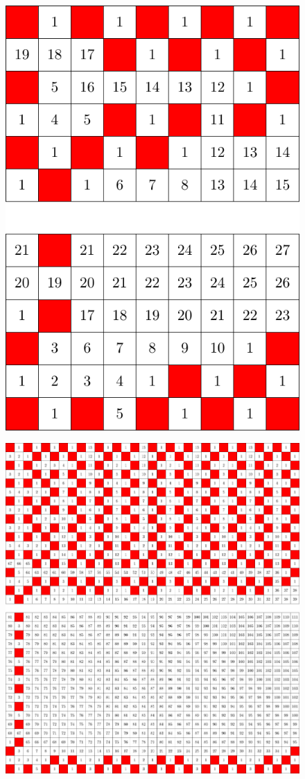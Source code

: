 \begin{figure}[]
\centering
\includegraphics[width=\textwidth]{figures/4/6x9x2_numbered_heatmap.pdf}
\caption{}
\label{fig:6x9x2}
\end{figure} 

\begin{figure}[]
\centering
\includegraphics[width=\textwidth]{figures/4/18x33x2_numbered_heatmap.pdf}
\caption{}
\label{fig:6x9x2}
\end{figure} 
